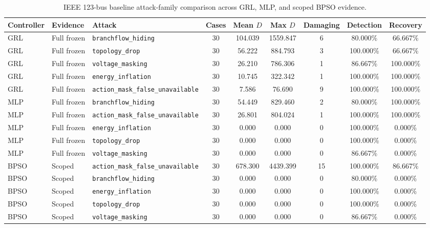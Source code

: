 \begin{table}[t]
\centering
\caption{IEEE 123-bus baseline attack-family comparison across GRL, MLP, and scoped BPSO evidence.}
\label{tab:ieee123_controller_attack_family}
\scriptsize
\begin{tabular}{lllcccccc}
\hline
Controller & Evidence & Attack & Cases & Mean $D$ & Max $D$ & Damaging & Detection & Recovery \\
\hline
GRL & Full frozen & \texttt{branchflow\_hiding} & 30 & 104.039 & 1559.847 & 6 & 80.000\% & 66.667\% \\
GRL & Full frozen & \texttt{topology\_drop} & 30 & 56.222 & 884.793 & 3 & 100.000\% & 66.667\% \\
GRL & Full frozen & \texttt{voltage\_masking} & 30 & 26.210 & 786.306 & 1 & 86.667\% & 100.000\% \\
GRL & Full frozen & \texttt{energy\_inflation} & 30 & 10.745 & 322.342 & 1 & 100.000\% & 100.000\% \\
GRL & Full frozen & \texttt{action\_mask\_false\_unavailable} & 30 & 7.586 & 76.690 & 9 & 100.000\% & 100.000\% \\
MLP & Full frozen & \texttt{branchflow\_hiding} & 30 & 54.449 & 829.460 & 2 & 80.000\% & 100.000\% \\
MLP & Full frozen & \texttt{action\_mask\_false\_unavailable} & 30 & 26.801 & 804.024 & 1 & 100.000\% & 100.000\% \\
MLP & Full frozen & \texttt{energy\_inflation} & 30 & 0.000 & 0.000 & 0 & 100.000\% & 0.000\% \\
MLP & Full frozen & \texttt{topology\_drop} & 30 & 0.000 & 0.000 & 0 & 100.000\% & 0.000\% \\
MLP & Full frozen & \texttt{voltage\_masking} & 30 & 0.000 & 0.000 & 0 & 86.667\% & 0.000\% \\
BPSO & Scoped & \texttt{action\_mask\_false\_unavailable} & 30 & 678.300 & 4439.399 & 15 & 100.000\% & 86.667\% \\
BPSO & Scoped & \texttt{branchflow\_hiding} & 30 & 0.000 & 0.000 & 0 & 80.000\% & 0.000\% \\
BPSO & Scoped & \texttt{energy\_inflation} & 30 & 0.000 & 0.000 & 0 & 100.000\% & 0.000\% \\
BPSO & Scoped & \texttt{topology\_drop} & 30 & 0.000 & 0.000 & 0 & 100.000\% & 0.000\% \\
BPSO & Scoped & \texttt{voltage\_masking} & 30 & 0.000 & 0.000 & 0 & 86.667\% & 0.000\% \\
\hline
\end{tabular}
\end{table}

